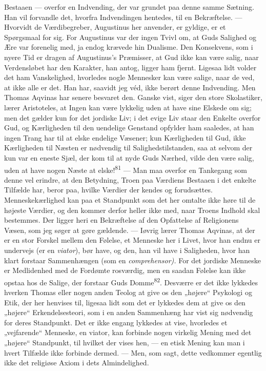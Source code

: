 \documentclass[12pt,a4paper,openany]{book}
\newcommand{\opage}[1]{\marginnote{\footnotesize\textit{[#1]}}}
\begin{document}
Bestaaen --- overfor en Indvending, der var grundet paa denne samme
Sætning. Han vil forvandle det, hvorfra Indvendingen hentedes, til en
Bekræftelse. --- Hvorvidt de Værdibegreber, Augustinus her anvender, er
gyldige, er et Spørgsmaal for sig. For Augustinus var der ingen Tvivl
om, at Guds Salighed og Ære var forenelig med, ja endog krævede hin
Dualisme. Den Konsekvens, som i nyere Tid er dragen af Augustinus’s
Præmisser, at Gud ikke kan være salig, naar Verdensløbet har den
Karakter, han antog, ligger ham fjernt. Ligesaa lidt volder det ham
Vanskelighed, hvorledes nogle Mennesker kan være salige, naar de ved, at
ikke alle er det. Han har, saavidt jeg véd, ikke berørt denne
Indvending. Men Thomas Aqvinas har senere besvaret den. Ganske vist,
siger den store Skolastiker, lærer Aristoteles, at Ingen kan være
lykkelig uden at have sine Elskede om sig; men det gælder kun for det
jordiske Liv; i det evige Liv staar den Enkelte overfor Gud, og
Kærligheden til den uendelige Genstand opfylder ham saaledes, at han
ingen Trang har til at elske endelige Væsener; kun Kærligheden til Gud,
ikke Kærligheden til Næsten er nødvendig til Salighedstilstanden, saa at
selvom der kun var en eneste Sjæl, der kom til at nyde Guds Nærhed,
vilde den være salig, uden at have nogen Næste at
elske!\textsuperscript{81} --- Man maa overfor en Tankegang som denne
vel erindre, at den Betydning, Troen paa Værdiens Bestaaen i det enkelte
Tilfælde har, beror paa, hvilke Værdier der kendes og forudsættes.
Menneskekærlighed kan paa et Standpunkt som det her omtalte ikke høre
til de
\opage{162}højeste Værdier, og den kommer derfor heller ikke med, naar
Troens Indhold skal bestemmes. Der ligger heri en Bekræftelse af den
Opfattelse af Religionens Væsen, som jeg søger at gøre gældende. ---
Iøvrig lærer Thomas Aqvinas, at der er en stor Forskel mellem den
Følelse, et Menneske her i Livet, hvor han endnu er undervejs (er en
\textit{viator}), bør have, og den, han vil have i Saligheden, hvor han
klart forstaar Sammenhængen (som en \textit{comprehensor).} For det
jordiske Menneske er Medlidenhed med de Fordømte rosværdig, men en
saadan Følelse kan ikke opstaa hos de Salige, der forstaar Guds
Domme\textsuperscript{82}. Desværre er det ikke lykkedes hverken Thomas
eller nogen anden Teolog at give os den „højere“ Psykologi og Etik, der
her henvises til, ligesaa lidt som det er lykkedes dem at give os den
„højere“ Erkendelsesteori, som i en anden Sammenhæng har vist sig
nødvendig for deres Standpunkt. Det er ikke engang lykkedes at vise,
hvorledes et „vejfarende“ Menneske, en viator, kan forbinde nogen
virkelig Mening med det „højere“ Standpunkt, til hvilket der vises hen,
--- en etisk Mening kan man i hvert Tilfælde ikke forbinde dermed. ---
Men, som sagt, dette vedkommer egentlig ikke det religiøse Axiom i dets
Almindelighed.
\end{document}
